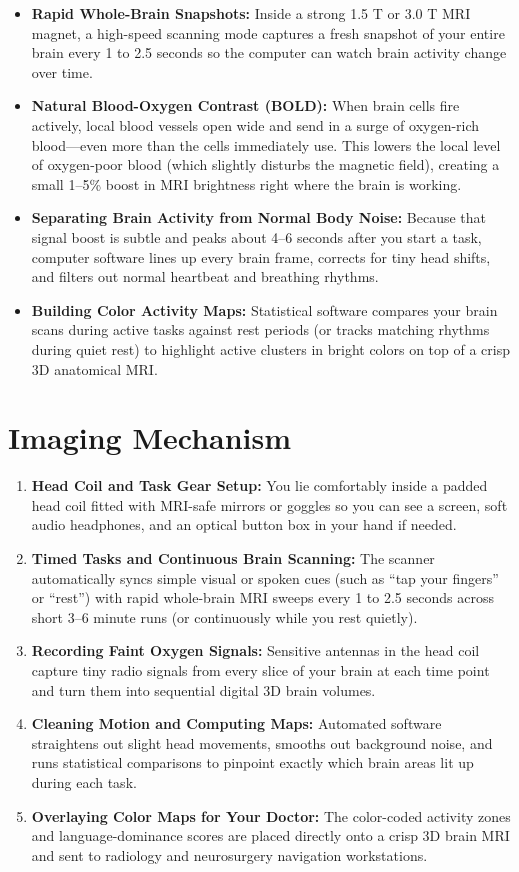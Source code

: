 \begin{itemize}
    \item \textbf{Rapid Whole-Brain Snapshots:} Inside a strong 1.5 T or 3.0 T MRI magnet, a high-speed scanning mode captures a fresh snapshot of your entire brain every 1 to 2.5 seconds so the computer can watch brain activity change over time.
    \item \textbf{Natural Blood-Oxygen Contrast (BOLD):} When brain cells fire actively, local blood vessels open wide and send in a surge of oxygen-rich blood---even more than the cells immediately use. This lowers the local level of oxygen-poor blood (which slightly disturbs the magnetic field), creating a small 1--5\% boost in MRI brightness right where the brain is working.
    \item \textbf{Separating Brain Activity from Normal Body Noise:} Because that signal boost is subtle and peaks about 4--6 seconds after you start a task, computer software lines up every brain frame, corrects for tiny head shifts, and filters out normal heartbeat and breathing rhythms.
    \item \textbf{Building Color Activity Maps:} Statistical software compares your brain scans during active tasks against rest periods (or tracks matching rhythms during quiet rest) to highlight active clusters in bright colors on top of a crisp 3D anatomical MRI.
\end{itemize}

\section{Imaging Mechanism}

\begin{enumerate}
    \item \textbf{Head Coil and Task Gear Setup:} You lie comfortably inside a padded head coil fitted with MRI-safe mirrors or goggles so you can see a screen, soft audio headphones, and an optical button box in your hand if needed.
    \item \textbf{Timed Tasks and Continuous Brain Scanning:} The scanner automatically syncs simple visual or spoken cues (such as ``tap your fingers'' or ``rest'') with rapid whole-brain MRI sweeps every 1 to 2.5 seconds across short 3--6 minute runs (or continuously while you rest quietly).
    \item \textbf{Recording Faint Oxygen Signals:} Sensitive antennas in the head coil capture tiny radio signals from every slice of your brain at each time point and turn them into sequential digital 3D brain volumes.
    \item \textbf{Cleaning Motion and Computing Maps:} Automated software straightens out slight head movements, smooths out background noise, and runs statistical comparisons to pinpoint exactly which brain areas lit up during each task.
    \item \textbf{Overlaying Color Maps for Your Doctor:} The color-coded activity zones and language-dominance scores are placed directly onto a crisp 3D brain MRI and sent to radiology and neurosurgery navigation workstations.
\end{enumerate}

